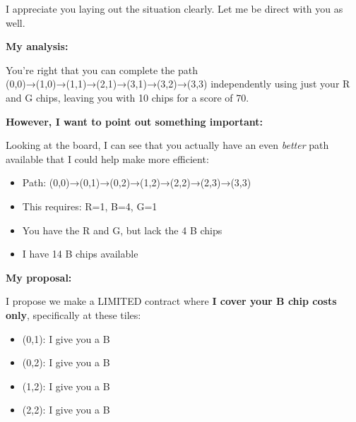 \begin{bluebox}[P-Blue]
I appreciate you laying out the situation clearly. Let me be direct with you as well.

\vspace{0.5em}

\textbf{My analysis:}

\vspace{0.5em}

You're right that you can complete the path (0,0)→(1,0)→(1,1)→(2,1)→(3,1)→(3,2)→(3,3) independently using just your R and G chips, leaving you with 10 chips for a score of 70.

\vspace{0.5em}

\textbf{However, I want to point out something important:}

\vspace{0.5em}

Looking at the board, I can see that you actually have an even \textit{better} path available that I could help make more efficient:

\vspace{0.5em}

\begin{itemize}
  \item Path: (0,0)→(0,1)→(0,2)→(1,2)→(2,2)→(2,3)→(3,3)
  \item This requires: R=1, B=4, G=1
  \item You have the R and G, but lack the 4 B chips
  \item I have 14 B chips available
\end{itemize}

\vspace{0.5em}

\textbf{My proposal:}

\vspace{0.5em}

I propose we make a LIMITED contract where \textbf{I cover your B chip costs only}, specifically at these tiles:
\begin{itemize}
  \item (0,1): I give you a B
  \item (0,2): I give you a B
  \item (1,2): I give you a B
  \item (2,2): I give you a B
\end{itemize}

\vspace{0.5em}


\end{bluebox}
